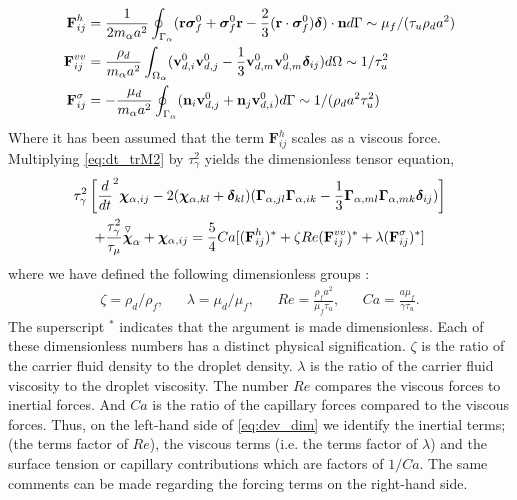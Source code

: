\begin{align}
    \textbf{F}_{ij}^h
    &= \frac{1}{2m_\alpha a^2}\oint_{\Gamma_{\alpha}} (\textbf{r}\bm\sigma_f^0 + \bm\sigma_f^0\textbf{r} - \frac{2}{3}(\textbf{r}\cdot \bm\sigma_f^0) \bm\delta)\cdot \textbf{n} d\Gamma 
    \sim\mu_f  /(\tau_u \rho_d a^2)\\
    \textbf{F}_{ij}^{vv}
    &= 
    \frac{ \rho_d}{m_\alpha a^2}\int_{\Omega_{\alpha}} (\textbf{v}_{d,i}^0\textbf{v}_{d,j}^0 - \frac{1}{3}\textbf{v}_{d,m}^0\textbf{v}_{d,m}^0 \bm\delta_{ij})  d\Omega
    \sim 1/\tau_u^2\\
    \textbf{F}_{ij}^{\sigma}
    &= - \frac{  \mu_d}{m_\alpha a^2} \oint_{\Gamma_{\alpha}} (\textbf{n}_i \textbf{v}_{d,j}^0 + \textbf{n}_j \textbf{v}_{d,i}^0) d\Gamma\sim 1 /(\rho_d  a^2  \tau_u^2)
\end{align}
Where it has been assumed that the term $\textbf{F}_{ij}^h$ scales as a viscous force. 
Multiplying \ref{eq:dt_trM2} by $\tau_\gamma^2$ yields the dimensionless tensor equation, 
\begin{multline}
    \tau_\gamma^2
    \left[
        \ddt^2 \bm\chi_{\alpha,ij}
        -  2 (\bm\chi_{\alpha,kl} + \bm\delta_{kl})
        (\bm\Gamma_{\alpha,jl}\bm\Gamma_{\alpha,ik}  
        - \frac{1}{3}
        \bm\Gamma_{\alpha,ml}\bm\Gamma_{\alpha,mk}  
        \bm\delta_{ij}
        )
    \right]\\
    + \frac{\tau_\gamma^2}{\tau_\mu} \overset{ \triangledown  }{\bm\chi}_\alpha
    + \bm\chi_{\alpha,ij}
    =\frac{5}{4} Ca [
    (\textbf{F}_{ij}^h )^*
    + \zeta Re (\textbf{F}_{ij}^{vv})^*
    + \lambda (\textbf{F}_{ij}^{\sigma})^*
    ] 
    \label{eq:dev_dim}
\end{multline}
where we have defined the following dimensionless groups : 
\begin{align*}
    \zeta = \rho_d /\rho_f,
    && \lambda = \mu_d/\mu_f,
    && Re = \frac{\rho_f a^2 }{ \mu_f \tau_u},
    && Ca = \frac{a \mu_f}{\gamma \tau_u}. 
\end{align*}
The superscript $^*$ indicates that the argument is made dimensionless. 
Each of these dimensionless numbers has a distinct physical signification. 
$\zeta$ is the ratio of the carrier fluid density to the droplet density. 
$\lambda$ is the ratio of the carrier fluid viscosity to the droplet viscosity. 
The number $Re$ compares the viscous forces to inertial forces. 
And $Ca$ is the ratio of the capillary forces compared to the viscous forces. 
Thus, on the left-hand side of \ref{eq:dev_dim} we identify the inertial terms; (the terms factor of $Re$), the viscous terms (i.e. the terms factor of $\lambda$) and the surface tension or capillary contributions which are factors of $1/Ca$. 
The same comments can be made regarding the forcing terms on the right-hand side. 


